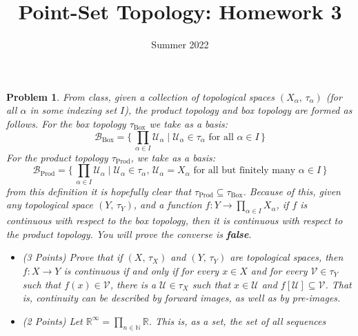 \documentclass{article}
\title{Point-Set Topology: Homework 3}
\date{Summer 2022}
\theoremstyle{normal}
\newtheorem{problem}{Problem}
\begin{document}
    \maketitle
    \begin{problem}
        From class, given a collection of topological spaces
        $(X_{\alpha},\,\tau_{\alpha})$ (for all $\alpha$ in some indexing set
        $I$), the product topology and box topology are formed as follows.
        For the box topology $\tau_{\textrm{Box}}$ we take as a basis:
        \begin{equation}
            \mathcal{B}_{\textrm{Box}}
            =\Big\{\,\prod_{\alpha\in{I}}\mathcal{U}_{\alpha}\;|\;
                \mathcal{U}_{\alpha}\in\tau_{\alpha}
                \textrm{ for all }\alpha\in{I}\,\Big\}
        \end{equation}
        For the product topology $\tau_{\textrm{Prod}}$, we take as a basis:
        \begin{equation}
            \mathcal{B}_{\textrm{Prod}}
            =\Big\{\,\prod_{\alpha\in{I}}\mathcal{U}_{\alpha}\;|\;
                \mathcal{U}_{\alpha}\in\tau_{\alpha},\,
                \mathcal{U}_{\alpha}=X_{\alpha}
                \textrm{ for all but finitely many }\alpha\in{I}\,\Big\}
        \end{equation}
        from this definition it is hopefully clear that
        $\tau_{\textrm{Prod}}\subseteq\tau_{\textrm{Box}}$. Because of this,
        given any topological space $(Y,\,\tau_{Y})$, and a function
        $f:Y\rightarrow\prod_{\alpha\in{I}}X_{\alpha}$, if $f$ is continuous
        with respect to the box topology, then it is continuous with respect to
        the product topology. You will prove the converse is \textbf{false}.
        \begin{itemize}
            \item (3 Points) Prove that if $(X,\,\tau_{X})$ and
                $(Y,\,\tau_{Y})$ are topological spaces, then
                $f:X\rightarrow{Y}$ is continuous if and only if for every
                $x\in{X}$ and for every $\mathcal{V}\in\tau_{Y}$ such that
                $f(x)\in\mathcal{V}$, there is a $\mathcal{U}\in\tau_{X}$ such
                that $x\in\mathcal{U}$ and
                $f[\mathcal{U}]\subseteq\mathcal{V}$. That is, continuity
                can be described by forward images, as well as by pre-images.
            \item (2 Points) Let
                $\mathbb{R}^{\infty}=\prod_{n\in\mathbb{N}}\mathbb{R}$. This is,
                as a set, the set of all sequences

\end{itemize}
\end{problem}
\end{document}
